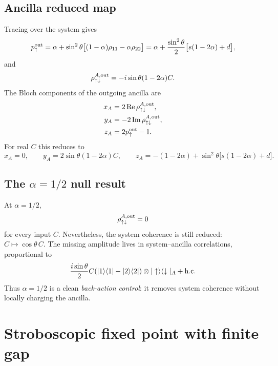 \documentclass[11pt,a4paper]{article}
\newcommand{\ket}[1]{|#1\rangle}
\newcommand{\bra}[1]{\langle #1|}
\newcommand{\proj}[1]{|#1\rangle\langle #1|}
\begin{document}
\subsection{Ancilla reduced map}

Tracing over the system gives
\begin{equation}
p_\uparrow^{\rm out}=\alpha+\sin^2\theta\big[(1-\alpha)\rho_{11}-\alpha\rho_{22}\big]
=\alpha+\frac{\sin^2\theta}{2}\big[s(1-2\alpha)+d\big],
\end{equation}
and
\begin{equation}
\rho_{\uparrow\downarrow}^{A,{\rm out}}=-i\sin\theta(1-2\alpha)C.
\end{equation}
The Bloch components of the outgoing ancilla are
\begin{align}
x_A&=2\operatorname{Re}\rho_{\uparrow\downarrow}^{A,{\rm out}},\\
y_A&=-2\operatorname{Im}\rho_{\uparrow\downarrow}^{A,{\rm out}},\\
z_A&=2p_\uparrow^{\rm out}-1.
\end{align}
For real $C$ this reduces to
\begin{equation}
x_A=0,
\qquad
 y_A=2\sin\theta(1-2\alpha)C,
\qquad
 z_A=-(1-2\alpha)+\sin^2\theta\big[s(1-2\alpha)+d\big].
\end{equation}

\subsection{The $\alpha=1/2$ null result}

At $\alpha=1/2$,
\begin{equation}
\rho_{\uparrow\downarrow}^{A,{\rm out}}=0
\end{equation}
for every input $C$. Nevertheless, the system coherence is still reduced: $C\mapsto\cos\theta\,C$. The missing amplitude lives in system--ancilla correlations, proportional to
\begin{equation}
\frac{i\sin\theta}{2}C(\proj{1}-\proj{2})\otimes\ket{\uparrow}\bra{\downarrow}_A+{\rm h.c.}
\end{equation}
Thus $\alpha=1/2$ is a clean \emph{back-action control}: it removes system coherence without locally charging the ancilla.

\section{Stroboscopic fixed point with finite gap}\label{sec:fixed}
\end{document}
